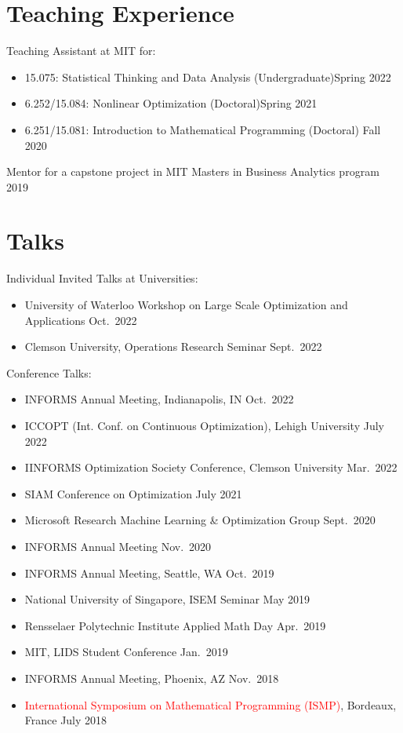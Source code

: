 \documentclass[11pt]{article}
\begin{document}
\section*{\large Teaching Experience}

\noindent Teaching Assistant at MIT for:
\begin{itemize}\setlength{\leftskip}{3ex}
\item  15.075: Statistical Thinking and Data Analysis (Undergraduate)\hfill Spring 2022
\item  6.252/15.084: Nonlinear Optimization (Doctoral)\hfill Spring 2021
\item 6.251/15.081: Introduction to Mathematical Programming (Doctoral) \hfill Fall 2020
\end{itemize}

\noindent Mentor for a capstone project in MIT Masters in Business Analytics program \hfill 2019

\section*{\large Talks} %

{\noindent  Individual Invited Talks at Universities:
\begin{itemize}
\item University of Waterloo Workshop on Large Scale Optimization and Applications \hfill  Oct.\ 2022
\item Clemson University, Operations Research Seminar \hfill Sept.\ 2022
\end{itemize}
}

{\noindent Conference Talks:}
\begin{itemize}
\item INFORMS Annual Meeting, Indianapolis, IN \hfill Oct.\ 2022
\item ICCOPT (Int. Conf. on Continuous Optimization), Lehigh University  \hfill July 2022
\item IINFORMS Optimization Society Conference, Clemson University \hfill Mar.\ 2022
\item SIAM Conference on Optimization \hfill July 2021
\item Microsoft Research Machine Learning \& Optimization Group \hfill Sept.\ 2020
\item INFORMS Annual Meeting \hfill Nov.\ 2020 
\item INFORMS Annual Meeting, Seattle, WA \hfill Oct.\ 2019
\item National University of Singapore, ISEM Seminar \hfill  May 2019
\item Rensselaer Polytechnic Institute Applied Math Day \hfill Apr.\ 2019
\item MIT, LIDS Student Conference \hfill Jan.\ 2019
\item INFORMS Annual Meeting, Phoenix, AZ \hfill  Nov.\ 2018
\item \textcolor{red}{International Symposium on Mathematical Programming (ISMP)}, Bordeaux, France \hfill July 2018
\end{itemize}
\end{document}
